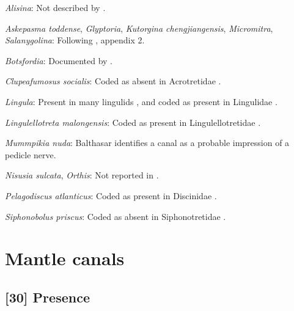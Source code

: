 \documentclass[openany]{book}
\theoremstyle{definition}
\theoremstyle{definition}
\theoremstyle{definition}
\theoremstyle{remark}
\begin{document}
\hypertarget{Alisina-coding-29}{}
\emph{Alisina}: Not described by
\citet{Williams2000LinguliformeaCraniiformea}.

\hypertarget{Askepasma_toddense-coding-29}{}
\emph{Askepasma toddense}, \emph{Glyptoria}, \emph{Kutorgina
chengjiangensis}, \emph{Micromitra}, \emph{Salanygolina}: Following
\citet{Williams1998Thediversity}, appendix 2.

\hypertarget{Botsfordia-coding-29}{}
\emph{Botsfordia}: Documented by \citet{Skovsted2017Depthrelated}.

\hypertarget{Clupeafumosus_socialis-coding-29}{}
\emph{Clupeafumosus socialis}: Coded as absent in Acrotretidae
\citep[table 6]{Williams2000LinguliformeaCraniiformea}.

\hypertarget{Lingula-coding-29}{}
\emph{Lingula}: Present in many lingulids
\citep{Williams2000LinguliformeaCraniiformea}, and coded as present in
Lingulidae \citep[table 6]{Williams2000LinguliformeaCraniiformea}.

\hypertarget{Lingulellotreta_malongensis-coding-29}{}
\emph{Lingulellotreta malongensis}: Coded as present in
Lingulellotretidae \citep[table
6]{Williams2000LinguliformeaCraniiformea}.

\hypertarget{Mummpikia_nuda-coding-29}{}
\emph{Mummpikia nuda}: Balthasar
\citeyearpar[p.~274]{Balthasar2008iMummpikia} identifies a canal as a
probable impression of a pedicle nerve.

\hypertarget{Nisusia_sulcata-coding-29}{}
\emph{Nisusia sulcata}, \emph{Orthis}: Not reported in
\citet{Williams2000LinguliformeaCraniiformea}.

\hypertarget{Pelagodiscus_atlanticus-coding-29}{}
\emph{Pelagodiscus atlanticus}: Coded as present in Discinidae
\citep[table 6]{Williams2000LinguliformeaCraniiformea}.

\hypertarget{Siphonobolus_priscus-coding-29}{}
\emph{Siphonobolus priscus}: Coded as absent in Siphonotretidae
\citep[table 6]{Williams2000LinguliformeaCraniiformea}.

\section{Mantle canals}\label{mantle-canals}

\subsection*{{[}30{]} Presence}\label{presence}
\end{document}
